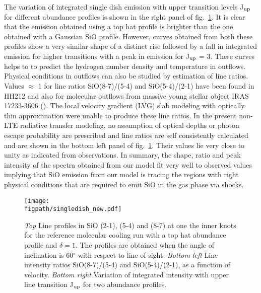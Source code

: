 \documentclass[useAMS,usenatbib]{mn2e}
\newcommand{\figpath}{/Users/bhargavvaidya/MyProject/work/Leeds_Uni/SiOJets_New/PAPER/PFIGS/}
\begin{document}
The variation of integrated single dish emission with upper transition
levels J$_{\rm up}$ for different abundance profiles is shown in the
right panel of fig.~\ref{fig:lineratio}. It is clear that the emission
obtained using a top hat profile is brighter than the one obtained
with a Gaussian SiO profile. However, curves obtained from
both these profiles show a very similar shape of a distinct rise followed by a fall in
integrated emission for higher transitions with a peak in
emission for J$_{\rm up}$ = 3. These curves helps to to predict the
hydrogen number density and temperature in outflows. Physical
conditions in outflows can also be studied by estimation of line ratios.
Values $\approx$ 1 for line ratios SiO(8-7)/(5-4) and SiO(5-4)/(2-1) have been
found in HH212 \citep{Cabrit:2007p13804,
  Lee:2008p13697} and also for molecular outflows from massive
young stellar object IRAS 17233-3606 (\citealt{Leurini:2013p13165}).
The local velocity gradient (LVG) slab modeling with optically thin approximation were unable to produce
these line ratios. 
In the present non-LTE radiative transfer modeling, no assumption of optical
depths or photon escape probability are prescribed and line ratios are
self consistently calculated and are shown in the bottom left panel of
fig.~\ref{fig:lineratio}. Their values lie very close to unity as
indicated from observations. 
In summary, the shape, ratio and peak intensity of the spectra
obtained from our model fit very well to observed values implying
that SiO emission from our model is tracing the regions with right physical
conditions that are required to emit SiO in the gas phase via shocks. 

\begin{figure*}
 \texttt{[image: \\figpath/singledish\_new.pdf]}%
 \caption{{\em{Top}} Line profiles in SiO (2-1), (5-4) and (8-7) at one
   the inner knots for the reference molecular cooling run with a top
   hat abundance profile and $\delta = 1$. The profiles are
   obtained when the angle of inclination is 60$^{\circ}$ with respect
 to line of sight. {\em{Bottom left}} Line intensity ratios SiO(8-7)/(5-4)
and SiO(5-4)/(2-1), as a function of velocity. {\em{Bottom right}}
Variation of integrated intensity with upper line transition J$_{\rm
  up}$ for two abundance profiles.}
\label{fig:lineratio}
\end{figure*}
\end{document}
